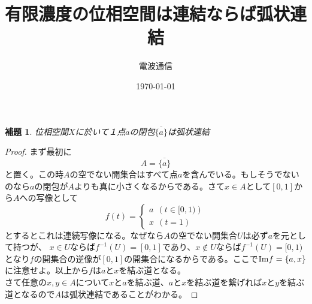 \documentclass[leqno]{jsarticle}
\title{有限濃度の位相空間は連結ならば弧状連結}
\author{電波通信}
\date{\today}
\newtheorem{lem}[thm]{補題}
\begin{document}
\maketitle

\begin{lem}
位相空間$X$に於いて１点$a$の閉包$\overline{\{a\}}$は弧状連結
\end{lem}
\begin{proof}まず最初に
\[
A=\overline{\{a\}}
\]
と置く。この時$A$の空でない開集合はすべて点$a$を含んでいる。もしそうでないのなら$a$の閉包が$A$よりも真に小さくなるからである。さて$x\in A$として$[0,1]$から$A$への写像として
\[f(t)=
\left\{
\begin{array}{l}
 a\ \ (t\in{[0,1)})\\
x\ \ (t=1)
\end{array}
\right.
\]
とするとこれは連続写像になる。なぜなら$A$の空でない開集合$U$は必ず$a$を元として持つが、
$x\in U$ならば$f^{-1}(U)=[0,1]$であり、$x\not\in U$ならば$f^{-1}(U)=[0,1)$となり$f$の開集合の逆像が$[0,1]$の開集合になるからである。ここで${\rm Im}f=\{a,x\}$に注意せよ。以上から$f$は$a$と$x$を結ぶ道となる。\\
さて任意の$x,y\in A$について$x$と$a$を結ぶ道、$a$と$x$を結ぶ道を繋げれば$x$と$y$を結ぶ道となるので$A$は弧状連結であることがわかる。
\end{proof}
\end{document}
